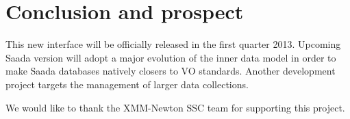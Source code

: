 \section {Conclusion and prospect}
This new interface will be officially released in the first quarter 2013.
Upcoming Saada version will adopt a major evolution of the inner data model in order to make Saada databases natively closers to VO standards. Another development project targets the management of larger data collections.

\acknowledgements We would like to thank the XMM-Newton SSC team for supporting this project.



